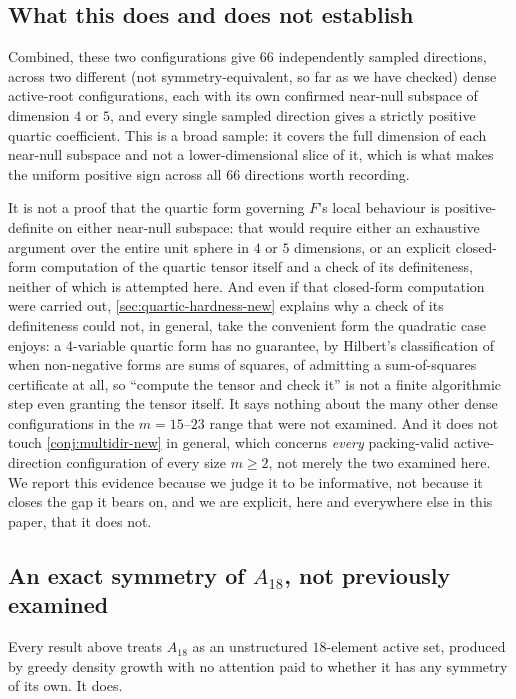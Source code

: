 \documentclass[11pt,reqno]{amsart}
\renewcommand{\_}{\origunderscore\allowbreak}
\numberwithin{equation}{section}
\theoremstyle{plain}
\theoremstyle{definition}
\theoremstyle{remark}
\begin{document}
\subsection{What this does and does not establish}

Combined, these two configurations give $66$ independently sampled
directions, across two different (not symmetry-equivalent, so
far as we have checked) dense active-root configurations, each with its
own confirmed near-null subspace of dimension $4$ or $5$, and every
single sampled direction gives a strictly positive quartic coefficient.
This is a broad sample: it covers the full dimension of each near-null subspace and not a lower-dimensional slice of it, which is what
makes the uniform positive sign across all $66$ directions worth
recording.

It is not a proof that the quartic form governing $F$'s local behaviour
is positive-definite on either near-null subspace: that would require
either an exhaustive argument over the entire unit sphere in $4$ or $5$
dimensions, or an explicit closed-form computation of the quartic
tensor itself and a check of its definiteness, neither of which is
attempted here. And even if that closed-form computation were carried
out, \cref{sec:quartic-hardness-new} explains why a check of its
definiteness could not, in general, take the convenient form the
quadratic case enjoys: a $4$-variable quartic form has no guarantee, by
Hilbert's classification of when non-negative forms are sums of squares,
of admitting a sum-of-squares certificate at all, so ``compute the
tensor and check it'' is not a finite algorithmic step even granting the
tensor itself. It says nothing about the many other dense
configurations in the $m=15$--$23$ range that were not examined. And it
does not touch \cref{conj:multidir-new} in general, which concerns
\emph{every} packing-valid active-direction configuration of every size
$m\ge2$, not merely the two examined here. We report this evidence
because we judge it to be informative, not because it closes
the gap it bears on, and we are explicit, here and everywhere else in
this paper, that it does not.

\subsection{An exact symmetry of \texorpdfstring{$A_{18}$}{A18}, not previously examined}\label{sec:a18-symmetry}

Every result above treats $A_{18}$ as an unstructured $18$-element active
set, produced by greedy density growth with no attention paid to whether
it has any symmetry of its own. It does.
\end{document}
